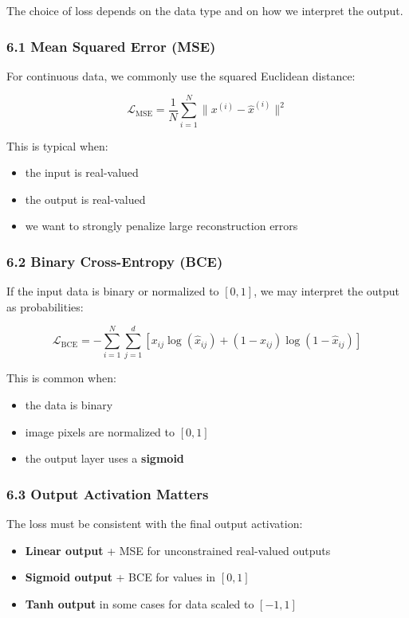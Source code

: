 \documentclass[
  italian,
  11pt,
]{article}
\begin{document}
The choice of loss depends on the data type and on how we interpret the
output.

\subsubsection{6.1 Mean Squared Error
(MSE)}\label{mean-squared-error-mse}

For continuous data, we commonly use the squared Euclidean distance:

\[
\mathcal{L}_{\text{MSE}} = \frac{1}{N} \sum_{i=1}^N \|x^{(i)} - \hat{x}^{(i)}\|^2
\]

This is typical when:

\begin{itemize}
\item
  the input is real-valued
\item
  the output is real-valued
\item
  we want to strongly penalize large reconstruction errors
\end{itemize}

\subsubsection{6.2 Binary Cross-Entropy
(BCE)}\label{binary-cross-entropy-bce}

If the input data is binary or normalized to \([0,1]\), we may interpret
the output as probabilities:

\[
\mathcal{L}_{\text{BCE}} =
- \sum_{i=1}^N \sum_{j=1}^d
\left[
x_{ij}\log(\hat{x}_{ij}) + (1 - x_{ij})\log(1 - \hat{x}_{ij})
\right]
\]

This is common when:

\begin{itemize}
\item
  the data is binary
\item
  image pixels are normalized to \([0,1]\)
\item
  the output layer uses a \textbf{sigmoid}
\end{itemize}

\subsubsection{6.3 Output Activation
Matters}\label{output-activation-matters}

The loss must be consistent with the final output activation:

\begin{itemize}
\item
  \textbf{Linear output} + MSE for unconstrained real-valued outputs
\item
  \textbf{Sigmoid output} + BCE for values in \([0,1]\)
\item
  \textbf{Tanh output} in some cases for data scaled to \([-1,1]\)
\end{itemize}
\end{document}
